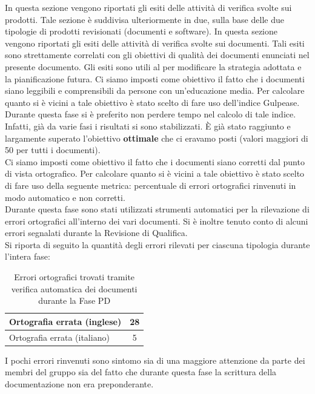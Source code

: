 		In questa sezione vengono riportati gli esiti delle attività di verifica svolte sui prodotti. Tale sezione è suddivisa ulteriormente in due, sulla base delle due tipologie di prodotti revisionati (documenti e software).
			In questa sezione vengono riportati gli esiti delle attività di verifica svolte sui documenti. Tali esiti sono strettamente correlati con gli obiettivi di qualità dei documenti enunciati nel presente documento. Gli esiti sono utili al  per modificare la strategia adottata e la pianificazione futura.
				Ci siamo imposti come obiettivo il fatto che i documenti siano leggibili e comprensibili da persone con un'educazione media. Per calcolare quanto si è vicini a tale obiettivo è stato scelto di fare uso dell'indice Gulpease.\\
				Durante questa fase si è preferito non perdere tempo nel calcolo di tale indice. Infatti, già da varie fasi i risultati si sono stabilizzati. È già stato raggiunto e largamente superato l'obiettivo \textbf{ottimale} che ci eravamo posti (valori maggiori di 50 per tutti i documenti).\\
				Ci siamo imposti come obiettivo il fatto che i documenti siano corretti dal punto di vista ortografico. Per calcolare quanto si è vicini a tale obiettivo è stato scelto di fare uso della seguente metrica: percentuale di errori ortografici rinvenuti in modo automatico e non corretti.\\
				Durante questa fase sono stati utilizzati strumenti automatici per la rilevazione di errori ortografici all'interno dei vari documenti. Si è inoltre tenuto conto di alcuni errori segnalati durante la Revisione di Qualifica.\\
				Si riporta di seguito la quantità degli errori rilevati per ciascuna tipologia durante l'intera fase:
				\begin{table}[H]
					\centering
						\begin{tabu}{| l | c |} \hline
							Ortografia errata (inglese) & 28\\ \hline
							Ortografia errata (italiano) & 5 \\ \hline
						\end{tabu}
					\caption{Errori ortografici trovati tramite verifica automatica dei documenti durante la Fase PD}
				\end{table}
				I pochi errori rinvenuti sono sintomo sia di una maggiore attenzione da parte dei membri del gruppo sia del fatto che durante questa fase la scrittura della documentazione non era preponderante.\\
